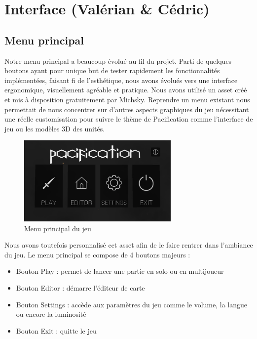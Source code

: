 \documentclass[12pt]{report}
\begin{document}
\chapter{Interface (Valérian \& Cédric)}

\section{Menu principal}

Notre menu principal a beaucoup évolué au fil du projet. Parti de quelques
boutons ayant pour unique but de tester rapidement les fonctionnalités
implémentées, faisant fi de l’esthétique, nous avons évolués vers une interface
ergonomique, visuellement agréable et pratique. Nous avons utilisé un asset créé
et mis à disposition gratuitement par Michsky. Reprendre un menu existant nous
permettait de nous concentrer sur d’autres aspects graphiques du jeu nécessitant
une réelle customisation pour suivre le thème de Pacification comme l’interface
de jeu ou les modèles 3D des unités.

\vspace{0.5cm}

\begin{figure}[H]
    \centering
    \includegraphics[width=0.7\textwidth]{../report_2/img/MainMenuScreen}
    \caption*{Menu principal du jeu}
\end{figure}

\newpage

Nous avons toutefois personnalisé cet asset afin de le faire rentrer dans
l'ambiance du jeu. Le menu principal se compose de 4 boutons majeurs :

\begin{itemize}
    \item Bouton Play : permet de lancer une partie en solo ou en multijoueur
    \item Bouton Editor : démarre l'éditeur de carte
    \item Bouton Settings : accède aux paramètres du jeu comme le volume, la
        langue ou encore la luminosité
    \item Bouton Exit : quitte le jeu
\end{itemize}
\end{document}
